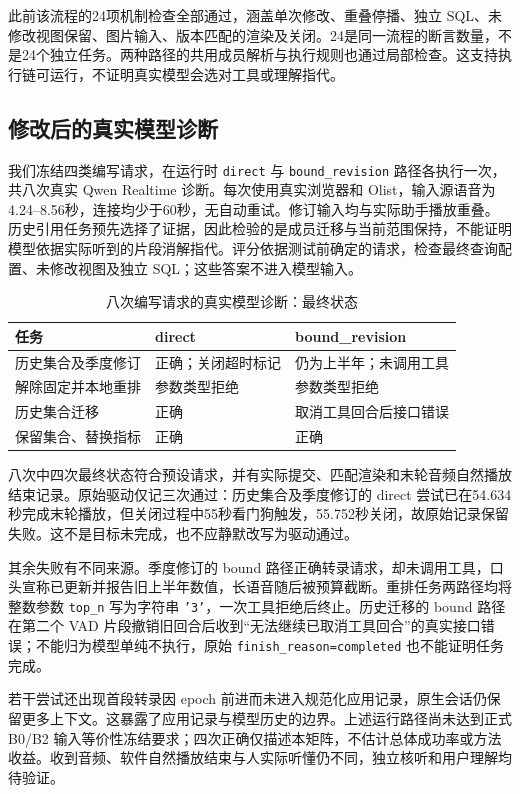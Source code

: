 \documentclass[conference]{IEEEtran}
\begin{document}
此前该流程的24项机制检查全部通过，涵盖单次修改、重叠停播、独立 SQL、未修改视图保留、图片输入、版本匹配的渲染及关闭。24是同一流程的断言数量，不是24个独立任务。两种路径的共用成员解析与执行规则也通过局部检查。这支持执行链可运行，不证明真实模型会选对工具或理解指代。

\subsection{修改后的真实模型诊断}
我们冻结四类编写请求，在运行时 \texttt{direct} 与 \texttt{bound\_revision} 路径各执行一次，共八次真实 Qwen Realtime 诊断。每次使用真实浏览器和 Olist，输入源语音为4.24--8.56秒，连接均少于60秒，无自动重试。修订输入均与实际助手播放重叠。历史引用任务预先选择了证据，因此检验的是成员迁移与当前范围保持，不能证明模型依据实际听到的片段消解指代。评分依据测试前确定的请求，检查最终查询配置、未修改视图及独立 SQL；这些答案不进入模型输入。

\begin{table}[t]
\caption{八次编写请求的真实模型诊断：最终状态}
\label{tab:real-matrix}
\centering\small
\begin{tabularx}{\columnwidth}{@{}p{}YY@{}}
\toprule
任务 & direct & bound\_revision \\
\midrule
历史集合及季度修订 & 正确；关闭超时标记 & 仍为上半年；未调用工具 \\
解除固定并本地重排 & 参数类型拒绝 & 参数类型拒绝 \\
历史集合迁移 & 正确 & 取消工具回合后接口错误 \\
保留集合、替换指标 & 正确 & 正确 \\
\bottomrule
\end{tabularx}
\end{table}

八次中四次最终状态符合预设请求，并有实际提交、匹配渲染和末轮音频自然播放结束记录。原始驱动仅记三次通过：历史集合及季度修订的 direct 尝试已在54.634秒完成末轮播放，但关闭过程中55秒看门狗触发，55.752秒关闭，故原始记录保留失败。这不是目标未完成，也不应静默改写为驱动通过。

其余失败有不同来源。季度修订的 bound 路径正确转录请求，却未调用工具，口头宣称已更新并报告旧上半年数值，长语音随后被预算截断。重排任务两路径均将整数参数 \texttt{top\_n} 写为字符串 \texttt{'3'}，一次工具拒绝后终止。历史迁移的 bound 路径在第二个 VAD 片段撤销旧回合后收到“无法继续已取消工具回合”的真实接口错误；不能归为模型单纯不执行，原始 \texttt{finish\_reason=completed} 也不能证明任务完成。

若干尝试还出现首段转录因 epoch 前进而未进入规范化应用记录，原生会话仍保留更多上下文。这暴露了应用记录与模型历史的边界。上述运行路径尚未达到正式 B0/B2 输入等价性冻结要求；四次正确仅描述本矩阵，不估计总体成功率或方法收益。收到音频、软件自然播放结束与人实际听懂仍不同，独立核听和用户理解均待验证。
\end{document}
